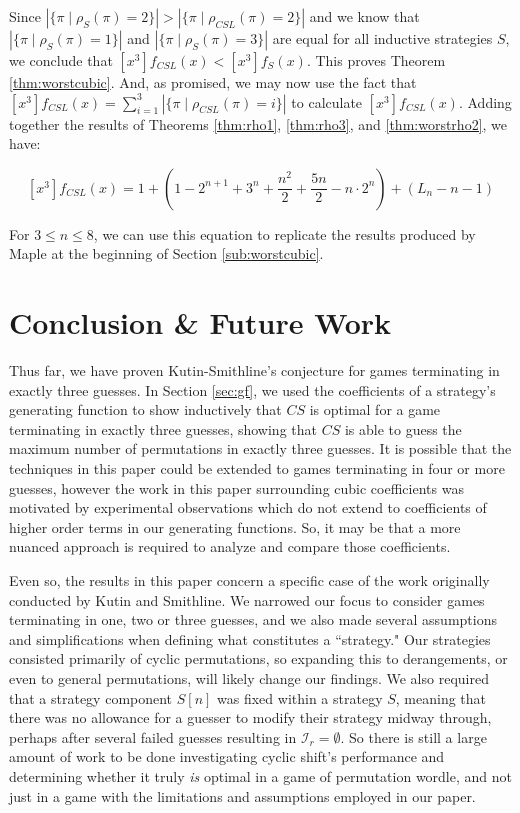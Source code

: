 \documentclass[article]{amsart}
\theoremstyle{definition}
\theoremstyle{definition}
\theoremstyle{remark}
\begin{document}
Since $|\{ \pi \mid \rho_{S}(\pi) = 2\}| > |\{ \pi \mid \rho_{CSL}(\pi) = 2\}|$ and we know that $|\{ \pi \mid \rho_{S}(\pi) = 1\}|$ and $|\{ \pi \mid \rho_{S}(\pi) = 3\}|$ are equal for all inductive strategies $S$, we conclude that $[x^3]f_{CSL}(x) < [x^3]f_S(x)$. This proves Theorem \ref{thm:worstcubic}. And, as promised, we may now use the fact that $[x^3]f_{CSL}(x) = \sum_{i=1}^3 |\{\pi \mid \rho_{CSL}(\pi) = i\}|$ to calculate $[x^3]f_{CSL}(x)$. Adding together the results of Theorems \ref{thm:rho1}, \ref{thm:rho3}, and \ref{thm:worstrho2}, we have:

\[ 
[x^3] f_{CSL}(x) = 
1 + \left( 1 - 2^{n + 1} + 3^n + \frac{n^2}{2} + \frac{5n}{2} - n\cdot 2^n \right) + \left( L_n - n - 1 \right)
\]

\vspace{0.25cm}

For $3 \leq n \leq 8$, we can use this equation to replicate the results produced by Maple at the beginning of Section \ref{sub:worstcubic}.  


\section{Conclusion \& Future Work} \label{sec:conc}

Thus far, we have proven Kutin-Smithline's conjecture for games terminating in exactly three guesses. In Section \ref{sec:gf}, we used the coefficients of a strategy's generating function to show inductively that $CS$ is optimal for a game terminating in exactly three guesses, showing that $CS$ is able to guess the maximum number of permutations in exactly three guesses. It is possible that the techniques in this paper could be extended to games terminating in four or more guesses, however the work in this paper surrounding cubic coefficients was motivated by experimental observations which do not extend to coefficients of higher order terms in our generating functions. So, it may be that a more nuanced approach is required to analyze and compare those coefficients.

Even so, the results in this paper concern a specific case of the work originally conducted by Kutin and Smithline. We narrowed our focus to consider games terminating in one, two or three guesses, and we also made several assumptions and simplifications when defining what constitutes a ``strategy." Our strategies consisted primarily of cyclic permutations, so expanding this to derangements, or even to general permutations, will likely change our findings. We also required that a strategy component $S[n]$ was fixed within a strategy $S$, meaning that there was no allowance for a guesser to modify their strategy midway through, perhaps after several failed guesses resulting in $\mathcal{I}_r = \emptyset$. So there is still a large amount of work to be done investigating cyclic shift's performance and determining whether it truly \textit{is} optimal in a game of permutation wordle, and not just in a game with the limitations and assumptions employed in our paper. 
\end{document}
